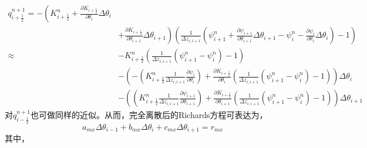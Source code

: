 \begin{equation}
\begin{aligned} q_{i+\frac{1}{2}}^{n+1}=-\left(K_{i+\frac{1}{2}}^{n}+\frac{\partial K_{i+\frac{1}{2}}}{\partial \theta_{i}} 
    \Delta \theta_{i}\right.\\ &\left.+\frac{\partial K_{i+\frac{1}{2}}}{\partial \theta_{i+1}} \Delta \theta_{i+1}\right)
    \left(\frac{1}{\Delta z_{i, i+1}}\left(\psi_{i+1}^{n}+\frac{\partial \psi_{i+1}}{\partial \theta_{i+1}} \Delta \theta_{i+1}-\psi_{i}^{n}-\frac{\partial \psi_{i}}
    {\partial \theta_{i}} \Delta \theta_{i}\right)-1\right) \\ \approx &-K_{i+\frac{1}{2}}^{n}\left(\frac{1}{\Delta z_{i, i+1}}\left(\psi_{i+1}^{n}-\psi_{i}^{n}\right)-1\right) \\
     &-\left(-\left(K_{i+\frac{1}{2}}^{n} \frac{1}{\Delta z_{i, i+1}} \frac{\partial \psi_{i}}{\partial \theta_{i}}\right)+\frac{\partial K_{i+\frac{1}{2}}}{\partial 
     \theta_{i}}\left(\frac{1}{\Delta z_{i, i+1}}\left(\psi_{i+1}^{n}-\psi_{i}^{n}\right)-1\right)\right) \Delta \theta_{i} \\ 
     &-\left(\left(K_{i+\frac{1}{2}}^{n} \frac{1}{\Delta z_{i, i+1}} \frac{\partial \psi_{i+1}}{\partial \theta_{i+1}}\right)+\frac{\partial K_{i+\frac{1}{2}}}{\partial
      \theta_{i+1}}\left(\frac{1}{\Delta z_{i, i+1}}\left(\psi_{i+1}^{n}-\psi_{i}^{n}\right)-1\right)\right) \Delta \theta_{i+1} \end{aligned}
\end{equation}
对$q_{i-\frac{1}{2}}^{n+1}$也可做同样的近似。从而，完全离散后的Richards方程可表达为，
\begin{equation}
{a}_{{mx}} \Delta \theta_{i-1}+b_{m x} \Delta \theta_{i}+c_{m x} \Delta \theta_{i+1}=r_{m x}
\end{equation}
其中，
